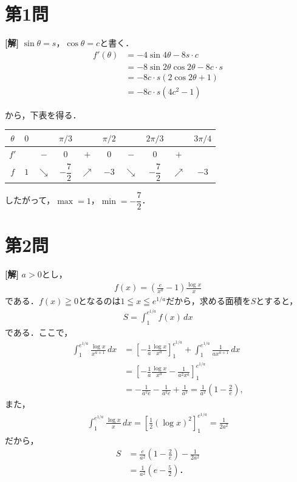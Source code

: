 \documentclass[../main.tex]{subfiles}
\begin{document}
\section*{第1問}

{\bf [解]}
$\sin\theta=s$，$\cos\theta=c$と書く．
\begin{align*}
  f'(\theta)&=-4\sin4\theta-8s\cdot c\\
  &=-8\sin2\theta\cos2\theta-8c\cdot s\\
  &=-8c\cdot s(2\cos2\theta+1)\\
  &=-8c\cdot s(4c^2-1)
\end{align*}

から，下表を得る．

\begin{center}
  \begin{tabular}{c|ccccccccc}
    $\theta$ & $0$ & & $\pi/3$ & & $\pi/2$ & & $2\pi/3$ & & $3\pi/4$ \\
    \hline
    $f'$ & & $-$ & $0$ & $+$ & $0$ & $-$ & $0$ & $+$ & \\
    \hline
    $f$ & $1$ & $\searrow$ & $-\dfrac72$ & $\nearrow$ & $-3$ & $\searrow$ & $-\dfrac72$ & $\nearrow$ & $-3$ \\
  \end{tabular}
\end{center}

したがって，$\max=1$，$\min=-\dfrac72$．

\newpage

\section*{第2問}

{\bf [解]}
$a>0$とし，
\begin{align*}
  f(x)=\left(\frac{e}{x^a}-1\right)\frac{\log x}{x}
\end{align*}
である．$f(x)\geqq0$となるのは$1\leqq x\leqq e^{1/a}$だから，求める面積を$S$とすると，
\begin{align*}
  S=\int_1^{e^{1/a}}f(x)\,dx
\end{align*}
である．ここで，
\begin{align*}
  \int_1^{e^{1/a}}\frac{\log x}{x^{a+1}}\,dx
  &=\left[-\frac{1}{a}\frac{\log x}{x^a}\right]_1^{e^{1/a}}
  +\int_1^{e^{1/a}}\frac{1}{a x^{a+1}}\,dx\\
  &=\left[-\frac{1}{a}\frac{\log x}{x^a}-\frac{1}{a^2 x^a}\right]_1^{e^{1/a}}\\
  &=-\frac{1}{a^2 e}-\frac{1}{a^2 e}+\frac{1}{a^2}
  =\frac{1}{a^2}\left(1-\frac{2}{e}\right),
\end{align*}
また，
\begin{align*}
  \int_1^{e^{1/a}}\frac{\log x}{x}\,dx
  =\left[\frac{1}{2}(\log x)^2\right]_1^{e^{1/a}}
  =\frac{1}{2a^2}
\end{align*}
だから，
\begin{align*}
  S&=\frac{e}{a^2}\left(1-\frac{2}{e}\right)-\frac{1}{2a^2}\\
  &=\frac{1}{a^2}\left(e-\frac{5}{2}\right)．
\end{align*}
\end{document}
